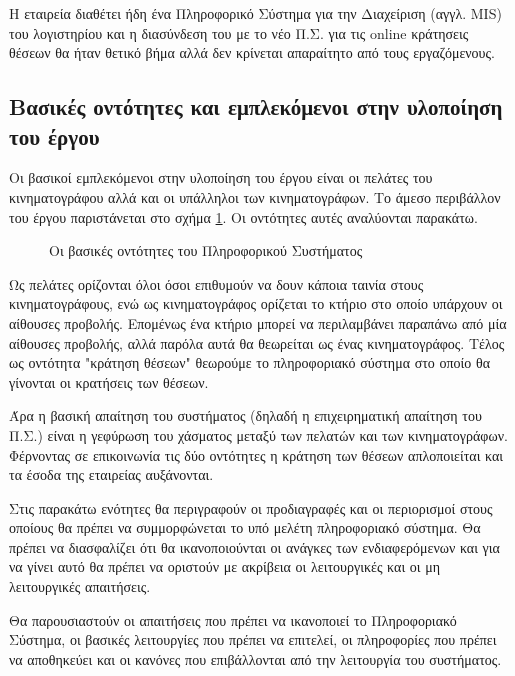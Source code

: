 \documentclass{assignment}
\begin{document}
Η εταιρεία διαθέτει ήδη ένα Πληροφορικό Σύστημα για την Διαχείριση (αγγλ. MIS) του λογιστηρίου και η διασύνδεση του με το νέο Π.Σ. για τις online κράτησεις θέσεων θα ήταν θετικό βήμα αλλά δεν κρίνεται απαραίτητο από τους εργαζόμενους.

\subsection{Βασικές οντότητες και εμπλεκόμενοι στην υλοποίηση του έργου}

Οι βασικοί εμπλεκόμενοι στην υλοποίηση του έργου είναι οι πελάτες του κινηματογράφου αλλά και οι υπάλληλοι των κινηματογράφων. Το άμεσο περιβάλλον του έργου παριστάνεται στο σχήμα \ref{fig:entities}. Οι οντότητες αυτές αναλύονται παρακάτω. 

\begin{figure}
\begin{center}
\caption{Οι βασικές οντότητες του Πληροφορικού Συστήματος}
\label{fig:entities}
\end{center}
\end{figure}

Ως πελάτες ορίζονται όλοι όσοι επιθυμούν να δουν κάποια ταινία στους κινηματογράφους, ενώ ως κινηματογράφος ορίζεται το κτήριο στο οποίο υπάρχουν οι αίθουσες προβολής. Επομένως ένα κτήριο μπορεί να περιλαμβάνει παραπάνω από μία αίθουσες προβολής, αλλά παρόλα αυτά θα θεωρείται ως ένας κινηματογράφος. Τέλος ως οντότητα "κράτηση θέσεων" θεωρούμε το πληροφοριακό σύστημα στο οποίο θα γίνονται οι κρατήσεις των θέσεων.

Άρα η βασική απαίτηση του συστήματος (δηλαδή η επιχειρηματική απαίτηση του Π.Σ.) είναι η γεφύρωση του χάσματος μεταξύ των πελατών και των κινηματογράφων. Φέρνοντας σε επικοινωνία τις δύο οντότητες η κράτηση των θέσεων απλοποιείται και τα έσοδα της εταιρείας αυξάνονται.

Στις παρακάτω ενότητες θα περιγραφούν οι προδιαγραφές και οι περιορισμοί στους οποίους θα πρέπει να συμμορφώνεται το υπό μελέτη πληροφοριακό σύστημα. Θα πρέπει να διασφαλίζει ότι θα ικανοποιούνται οι ανάγκες των ενδιαφερόμενων και για να γίνει αυτό θα πρέπει να οριστούν με ακρίβεια οι λειτουργικές και οι μη λειτουργικές απαιτήσεις.

Θα παρουσιαστούν οι απαιτήσεις που πρέπει να ικανοποιεί το Πληροφοριακό Σύστημα, οι βασικές λειτουργίες που πρέπει να επιτελεί, οι πληροφορίες που πρέπει να αποθηκεύει και οι κανόνες που επιβάλλονται από την λειτουργία του συστήματος.
\end{document}
